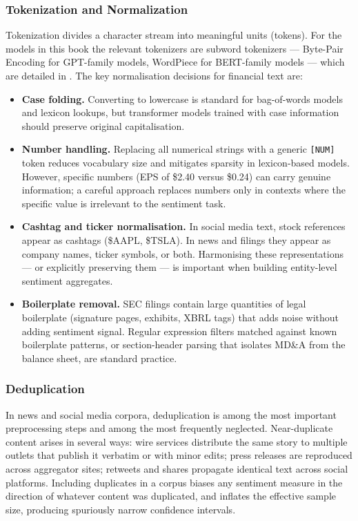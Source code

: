 \subsubsection*{Tokenization and Normalization}

Tokenization divides a character stream into meaningful units (tokens). For the models in this book the relevant tokenizers are subword tokenizers --- Byte-Pair Encoding for GPT-family models, WordPiece for BERT-family models --- which are detailed in . The key normalisation decisions for financial text are:

\begin{itemize}
  \item \textbf{Case folding.} Converting to lowercase is standard for bag-of-words models and lexicon lookups, but transformer models trained with case information should preserve original capitalisation.

  \item \textbf{Number handling.} Replacing all numerical strings with a generic \texttt{[NUM]} token reduces vocabulary size and mitigates sparsity in lexicon-based models. However, specific numbers (EPS of \$2.40 versus \$0.24) can carry genuine information; a careful approach replaces numbers only in contexts where the specific value is irrelevant to the sentiment task.

  \item \textbf{Cashtag and ticker normalisation.} In social media text, stock references appear as cashtags (\$AAPL, \$TSLA). In news and filings they appear as company names, ticker symbols, or both. Harmonising these representations --- or explicitly preserving them --- is important when building entity-level sentiment aggregates.

  \item \textbf{Boilerplate removal.} SEC filings contain large quantities of legal boilerplate (signature pages, exhibits, XBRL tags) that adds noise without adding sentiment signal. Regular expression filters matched against known boilerplate patterns, or section-header parsing that isolates MD\&A from the balance sheet, are standard practice.
\end{itemize}

\subsubsection*{Deduplication}

In news and social media corpora, deduplication is among the most important preprocessing steps and among the most frequently neglected. Near-duplicate content arises in several ways: wire services distribute the same story to multiple outlets that publish it verbatim or with minor edits; press releases are reproduced across aggregator sites; retweets and shares propagate identical text across social platforms. Including duplicates in a corpus biases any sentiment measure in the direction of whatever content was duplicated, and inflates the effective sample size, producing spuriously narrow confidence intervals.

